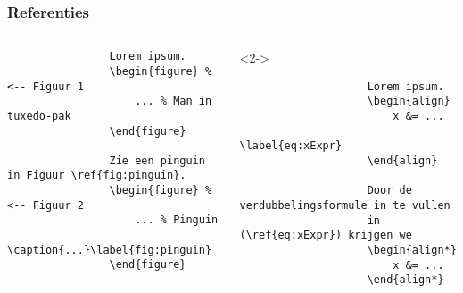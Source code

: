 \begin{frame}[fragile]
    \frametitle{Referenties}

    \begin{columns}
        \begin{column}{0.5\textwidth}
            \begin{verbatim}
                Lorem ipsum.
                \begin{figure} % <-- Figuur 1
                    ... % Man in tuxedo-pak
                \end{figure}
        
                Zie een pinguin in Figuur \ref{fig:pinguin}.
                \begin{figure} % <-- Figuur 2
                    ... % Pinguin
                    \caption{...}\label{fig:pinguin}
                \end{figure}
            \end{verbatim}
        \end{column}
        \begin{column}{0.5\textwidth}
            \begin{onlyenv}<2->
                \begin{verbatim}
                    Lorem ipsum.
                    \begin{align}
                        x &= ...
                        \label{eq:xExpr}
                    \end{align}
    
                    Door de verdubbelingsformule in te vullen
                    in (\ref{eq:xExpr}) krijgen we
                    \begin{align*}
                        x &= ...
                    \end{align*}
                \end{verbatim}
            \end{onlyenv}
        \end{column}
    \end{columns}
\end{frame}
